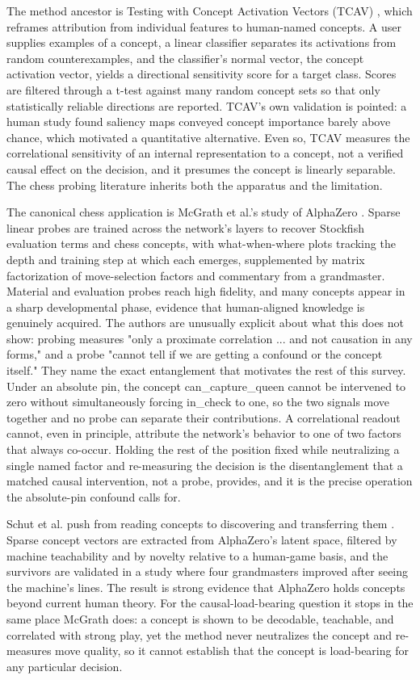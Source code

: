 \documentclass[conference]{IEEEtran}
\begin{document}
The method ancestor is Testing with Concept Activation Vectors (TCAV) \cite{ref31}, which reframes attribution from individual features to human-named concepts. A user supplies examples of a concept, a linear classifier separates its activations from random counterexamples, and the classifier's normal vector, the concept activation vector, yields a directional sensitivity score for a target class. Scores are filtered through a t-test against many random concept sets so that only statistically reliable directions are reported. TCAV's own validation is pointed: a human study found saliency maps conveyed concept importance barely above chance, which motivated a quantitative alternative. Even so, TCAV measures the correlational sensitivity of an internal representation to a concept, not a verified causal effect on the decision, and it presumes the concept is linearly separable. The chess probing literature inherits both the apparatus and the limitation.

The canonical chess application is McGrath et al.'s study of AlphaZero \cite{ref1}. Sparse linear probes are trained across the network's layers to recover Stockfish evaluation terms and chess concepts, with what-when-where plots tracking the depth and training step at which each emerges, supplemented by matrix factorization of move-selection factors and commentary from a grandmaster. Material and evaluation probes reach high fidelity, and many concepts appear in a sharp developmental phase, evidence that human-aligned knowledge is genuinely acquired. The authors are unusually explicit about what this does not show: probing measures "only a proximate correlation ... and not causation in any forms," and a probe "cannot tell if we are getting a confound or the concept itself." They name the exact entanglement that motivates the rest of this survey. Under an absolute pin, the concept can\_capture\_queen cannot be intervened to zero without simultaneously forcing in\_check to one, so the two signals move together and no probe can separate their contributions. A correlational readout cannot, even in principle, attribute the network's behavior to one of two factors that always co-occur. Holding the rest of the position fixed while neutralizing a single named factor and re-measuring the decision is the disentanglement that a matched causal intervention, not a probe, provides, and it is the precise operation the absolute-pin confound calls for.

Schut et al. push from reading concepts to discovering and transferring them \cite{ref2}. Sparse concept vectors are extracted from AlphaZero's latent space, filtered by machine teachability and by novelty relative to a human-game basis, and the survivors are validated in a study where four grandmasters improved after seeing the machine's lines. The result is strong evidence that AlphaZero holds concepts beyond current human theory. For the causal-load-bearing question it stops in the same place McGrath does: a concept is shown to be decodable, teachable, and correlated with strong play, yet the method never neutralizes the concept and re-measures move quality, so it cannot establish that the concept is load-bearing for any particular decision.
\end{document}
